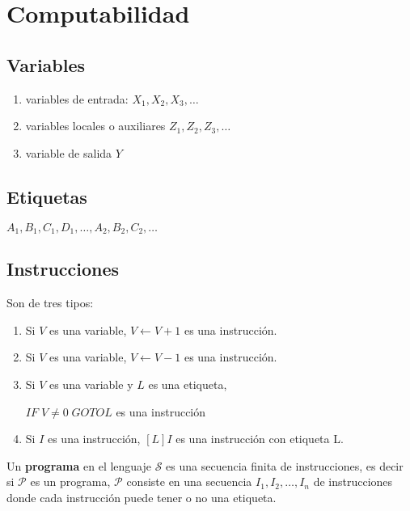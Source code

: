 \section{Computabilidad}
 
\subsection{Variables}
 
\begin{enumerate}
	\item variables de entrada: $X_1, X_2, X_3, \ldots$ 
	\item variables locales o auxiliares $Z_1, Z_2, Z_3, \ldots$
	\item variable de salida $Y$
\end{enumerate}
 
\subsection{Etiquetas}
 
$A_1, B_1, C_1, D_1, \ldots, A_2, B_2, C_2, \ldots$
 
\subsection{Instrucciones}
 
Son de tres tipos:
 
\begin{enumerate}
	\item Si $V$ es una variable, $V \leftarrow V + 1$ es una instrucci\'on.
	\item Si $V$ es una variable, $V \leftarrow V - 1$ es una instrucci\'on.
	\item Si $V$ es una variable y $L$ es una etiqueta,
	
	$IF \; V \neq 0 \; GOTO L$ es una instrucci\'on
	\item Si $I$ es una instrucci\'on, $[L] I$ es una instrucci\'on con etiqueta L.	
	
\end{enumerate}
 
\begin{definition}
Un \textbf{programa} en el lenguaje $\mathcal{S}$ es una secuencia finita de instrucciones, es decir si $\mathcal{P}$ es un programa, $\mathcal{P}$ consiste en una secuencia $I_1, I_2, \ldots, I_n$ de instrucciones donde cada instrucci\'on puede tener o no una etiqueta. 
\end{definition}
 
